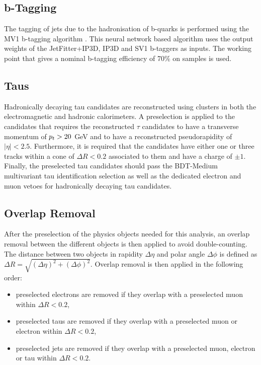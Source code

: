 \subsection{b-Tagging}
\label{sec:presel:btag}

The tagging of jets due to the hadronisation of b-quarks is performed
using the MV1 b-tagging algorithm \cite{mv1}. This neural network based
algorithm uses the output weights of the JetFitter+IP3D, IP3D and
SV1 b-taggers as inputs. The working point that gives a nominal
b-tagging efficiency of 70\% on \ttbar samples is used.

\subsection{Taus}
\label{sec:presel:tau}

Hadronically decaying tau candidates are reconstructed using clusters
in both the electromagnetic and hadronic calorimeters. A preselection
is applied to the candidates that requires the reconstructed $\tau$
candidates to have a transverse momentum of $p_{t}>20$ GeV and to have
a reconstructed pseudorapidity of $|\eta| < 2.5$. Furthermore, it is
required that the candidates have either one or three tracks within a
cone of $\Delta R < 0.2$ associated to them and have a charge of $\pm
1$. Finally, the preselected tau candidates should pass the BDT-Medium
multivariant tau identification selection as well as the dedicated
electron and muon vetoes for hadronically decaying tau candidates.


\subsection{Overlap Removal}
\label{sec:presel:olr}

After the preselection of the physics objects needed for this
analysis, an overlap removal between the different objects is then
applied to avoid double-counting.  The distance between two objects in
rapidity $\Delta\eta$ and polar angle $\Delta\phi$ is defined as
$\Delta R=\sqrt{(\Delta\eta)^2+(\Delta\phi)^2}$. Overlap removal is
then applied in the following order:

\begin{itemize}
\item preselected electrons are removed if they overlap with a preselected muon  within $\Delta R < 0.2$,
\item preselected taus are removed if they overlap with a preselected muon or electron within $\Delta R < 0.2$,
\item preselected jets are removed  if they overlap with a preselected
  muon, electron or tau within \linebreak $\Delta R<0.2$.
\end{itemize}

